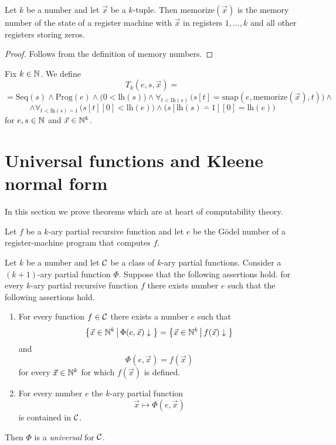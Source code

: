 \documentclass[10pt]{amsart}
\begin{document}
\begin{proposition}\label{proposition:memorize_function}
	Let $k$ be a number and let $\vec{x}$ be a $k$-tuple. Then $\mathrm{memorize}(\vec{x})$ is the memory number of the state of a register machine with $\vec{x}$ in registers $1,...,k$ and all other registers storing zeros.
\end{proposition}
\begin{proof}
	Follows from the definition of memory numbers.
\end{proof}
\noindent
Fix $k \in {\mathbb N}$. We define
$$T_k(e,s,\vec{x}) = $$
$$=\mathrm{Seq}(s)\wedge \mathrm{Prog}(e)\wedge \big(0 < \mathrm{lh}(s)\big) \wedge \forall_{t < \mathrm{lh}(s)}\,\bigg(s[t] = \mathrm{snap}(e,\mathrm{memorize}(\vec{x}),t)\bigg)\wedge $$
$$\wedge \forall_{t < \mathrm{lh}(s) \dotminus 1}\,\bigg(s[t][0] < \mathrm{lh}(e)\bigg)\wedge \big(s[\mathrm{lh}(s)\dotminus 1][0] = \mathrm{lh}(e)\big) $$
for $e,s\in {\mathbb N}$ and $\vec{x} \in {\mathbb N}^k$.

\section{Universal functions and Kleene normal form}
\noindent
In this section we prove theorems which are at heart of computability theory.


\begin{theorem}\label{theorem:Kleene_normal_form_snapshot_form}
	Let $f$ be a $k$-ary partial recursive function and let $e$ be the G{\"o}del number of a register-machine program that computes $f$.
\end{theorem}

\begin{definition}
	Let $k$ be a number and let ${\mathcal C}$ be a class of $k$-ary partial functions. Consider a $(k+1)$-ary partial function $\Phi$. Suppose that the following assertions hold.
	for every $k$-ary partial recursive function $f$ there exists number $e$ such that the following assertions hold.
	\begin{enumerate}[label=\textbf{(\arabic*)}, leftmargin=3.0em]
		\item For every function $f \in {\mathcal C}$ there exists a number $e$ such that
		      $$\big\{\vec{x}\in {\mathbb N}^k\,\big|\,\Phi(e,\vec{x})\downarrow\big\} = \big\{\vec{x}\in {\mathbb N}^k\,\big|\,f(\vec{x})\downarrow\big\}$$
		      and
		      $$\Phi(e,\vec{x}) = f(\vec{x})$$
		      for every $\vec{x} \in {\mathbb N}^k$ for which $f(\vec{x})$ is defined.
		\item For every number $e$ the $k$-ary partial function
		      $$\vec{x} \mapsto \Phi(e,\vec{x})$$
		      is contained in ${\mathcal C}$.
	\end{enumerate}
	Then $\Phi$ is a \textit{universal} for ${\mathcal C}$.
\end{definition}
\end{document}
